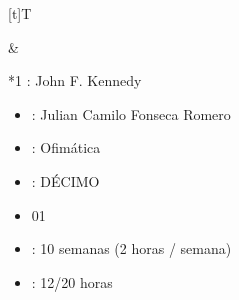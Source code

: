 \documentclass[letterpaper,10pt,spanish]{sphinxmanual}
\begin{document}
\begin{savenotes}\sphinxattablestart
\sphinxthistablewithglobalstyle
\centering
\begin{tabular}[t]{}
\sphinxtoprule
\sphinxtableatstartofbodyhook

\begin{savenotes}\sphinxattablestart
\sphinxthistablewithglobalstyle
\centering
\begin{tabulary}{\linewidth}[t]{T}
\sphinxtoprule
\sphinxtableatstartofbodyhook
\sphinxAtStartPar
{}
\\
\sphinxbottomrule
\end{tabulary}
\sphinxtableafterendhook\par
\sphinxattableend\end{savenotes}
&

\begin{savenotes}\sphinxattablestart
\sphinxthistablewithglobalstyle
\raggedright
\begin{tabular}[t]{*{1}{}}
\sphinxtoprule
\sphinxtableatstartofbodyhook
\sphinxAtStartPar
{}: John F. Kennedy
\begin{itemize}
\item {} 
\sphinxAtStartPar
{}: Julian Camilo Fonseca Romero

\item {} 
\sphinxAtStartPar
{}: Ofimática

\item {} 
\sphinxAtStartPar
{}: DÉCIMO

\item {} 
\sphinxAtStartPar
{} 01

\item {} 
\sphinxAtStartPar
{}: 10 semanas (2 horas / semana)

\item {} 
\sphinxAtStartPar
{}: 12/20 horas

\end{itemize}
\\
\sphinxbottomrule
\end{tabular}
\sphinxtableafterendhook\par
\sphinxattableend\end{savenotes}
\\
\sphinxbottomrule
\end{tabular}
\sphinxtableafterendhook\par
\sphinxattableend\end{savenotes}
\end{document}
